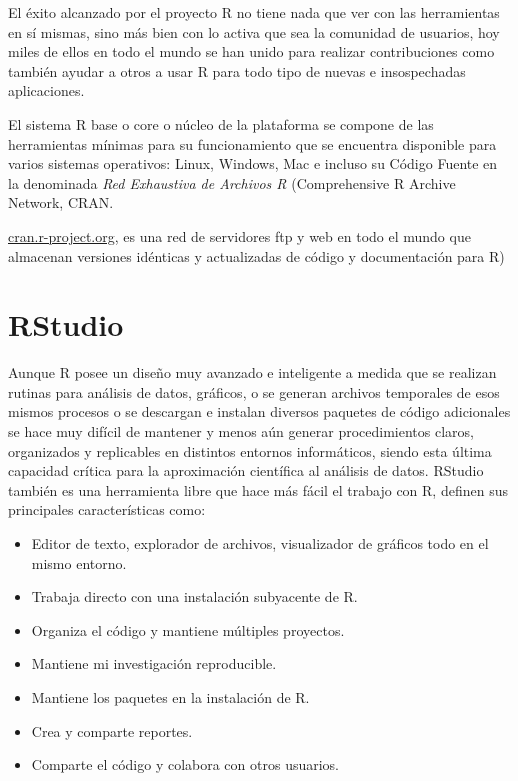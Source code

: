 \documentclass[
]{book}
\providecommand{\tightlist}{%
  \setlength{\itemsep}{0pt}\setlength{\parskip}{0pt}}
\begin{document}
El éxito alcanzado por el proyecto R no tiene nada que ver con las herramientas en sí mismas, sino más bien con lo activa que sea la comunidad de usuarios, hoy miles de ellos en todo el mundo se han unido para realizar contribuciones como también ayudar a otros a usar R para todo tipo de nuevas e insospechadas aplicaciones.

El sistema R base o core o núcleo de la plataforma se compone de las herramientas mínimas para su funcionamiento que se encuentra disponible para varios sistemas operativos: Linux, Windows, Mac e incluso su Código Fuente en la denominada \emph{Red Exhaustiva de Archivos R} (Comprehensive R Archive Network, CRAN.

\href{https://cran.r-project.org/}{cran.r-project.org}, es una red de servidores ftp y web en todo el mundo que almacenan versiones idénticas y actualizadas de código y documentación para R)

\hypertarget{rstudio}{%
\section{\texorpdfstring{RStudio}{RStudio}}\label{rstudio}}

Aunque R posee un diseño muy avanzado e inteligente a medida que se realizan rutinas para análisis de datos, gráficos, o se generan archivos temporales de esos mismos procesos o se descargan e instalan diversos paquetes de código adicionales se hace muy difícil de mantener y menos aún generar procedimientos claros, organizados y replicables en distintos entornos informáticos, siendo esta última capacidad crítica para la aproximación científica al análisis de datos. RStudio también es una herramienta libre que hace más fácil el trabajo con R, \citet{Loo2012} definen sus principales características como:

\begin{itemize}
\tightlist
\item
  Editor de texto, explorador de archivos, visualizador de gráficos todo en el mismo entorno.
\item
  Trabaja directo con una instalación subyacente de R.
\item
  Organiza el código y mantiene múltiples proyectos.
\item
  Mantiene mi investigación reproducible.
\item
  Mantiene los paquetes en la instalación de R.
\item
  Crea y comparte reportes.
\item
  Comparte el código y colabora con otros usuarios.
\end{itemize}
\end{document}
